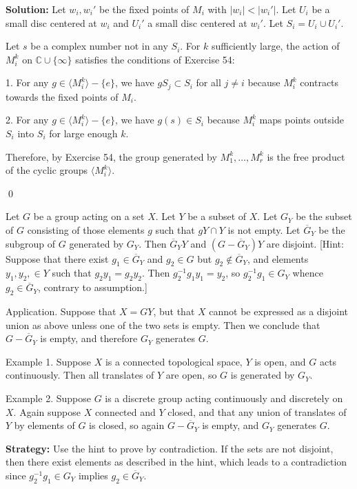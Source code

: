 \noindent\textbf{Solution:} Let $w_i, w_i'$ be the fixed points of $M_i$ with $|w_i| < |w_i'|$. Let $U_i$ be a small disc centered at $w_i$ and $U_i'$ a small disc centered at $w_i'$. Let $S_i = U_i \cup U_i'$.

Let $s$ be a complex number not in any $S_i$. For $k$ sufficiently large, the action of $M_i^k$ on $\mathbb{C} \cup \{\infty\}$ satisfies the conditions of Exercise 54:

1. For any $g \in \langle M_i^k \rangle - \{e\}$, we have $gS_j \subset S_i$ for all $j \neq i$ because $M_i^k$ contracts towards the fixed points of $M_i$.

2. For any $g \in \langle M_i^k \rangle - \{e\}$, we have $g(s) \in S_i$ because $M_i^k$ maps points outside $S_i$ into $S_i$ for large enough $k$.

Therefore, by Exercise 54, the group generated by $M_1^k, \ldots, M_r^k$ is the free product of the cyclic groups $\langle M_i^k \rangle$.


\qed
\begin{problembox}
Let $G$ be a group acting on a set $X$. Let $Y$ be a subset of $X$. Let $G_Y$ be the subset of $G$ consisting of those elements $g$ such that $gY \cap Y$ is not empty. Let $\overline{G}_Y$ be the subgroup of $G$ generated by $G_Y$. Then $\overline{G}_Y Y$ and $(G - \overline{G}_Y)Y$ are disjoint. [Hint: Suppose that there exist $g_1 \in \overline{G}_Y$ and $g_2 \in G$ but $g_2 \notin \overline{G}_Y$, and elements $y_1, y_2, \in Y$ such that $g_2y_1 = g_2y_2$. Then $g_2^{-1}g_1y_1 = y_2$, so $g_2^{-1}g_1 \in G_Y$ whence $g_2 \in \overline{G}_Y$, contrary to assumption.]

Application. Suppose that $X = GY$, but that $X$ cannot be expressed as a disjoint union as above unless one of the two sets is empty. Then we conclude that $G - \overline{G}_Y$ is empty, and therefore $G_Y$ generates $G$.

Example 1. Suppose $X$ is a connected topological space, $Y$ is open, and $G$ acts continuously. Then all translates of $Y$ are open, so $G$ is generated by $G_Y$.

Example 2. Suppose $G$ is a discrete group acting continuously and discretely on $X$. Again suppose $X$ connected and $Y$ closed, and that any union of translates of $Y$ by elements of $G$ is closed, so again $G - \overline{G}_Y$ is empty, and $G_Y$ generates $G$.
\end{problembox}

\noindent\textbf{Strategy:} Use the hint to prove by contradiction. If the sets are not disjoint, then there exist elements as described in the hint, which leads to a contradiction since $g_2^{-1}g_1 \in G_Y$ implies $g_2 \in \overline{G}_Y$.

